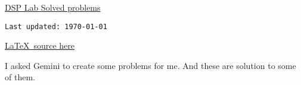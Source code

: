 \documentclass[11pt,a4paper]{article}
\newcommand{\note}[1]{%
	\begin{tcolorbox}[colframe=orange!75!black]
		#1
	\end{tcolorbox}
}
\begin{document}
\begin{center}
	{\Huge \normalfont \underline{DSP Lab Solved problems}}
	
	\vspace*{10pt}
	\texttt{Last updated: \today\ \DTMcurrenttime}
	
	\href{https://github.com/roopeshor/tex-works/tree/main/Lab\%20Programs/DSP}{\LaTeX\ source here}
	\vspace*{10pt}
\end{center}
\note{I asked Gemini to create some problems for me. And these are solution to some of them.}
\begin{center}
	{\let\clearpage\relax \tableofcontents}
\end{center}



{}
\setlength{\parindent}{0pt}




% 

\end{document}
